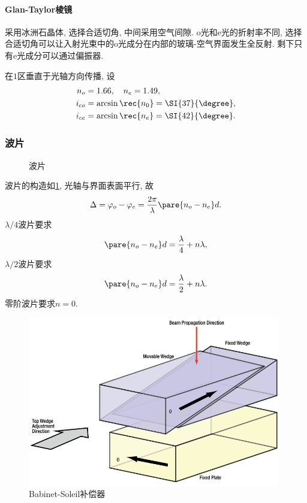 \documentclass{ctexart}
\begin{document}
\paragraph{Glan-Taylor棱镜} %
\label{par:glan_taylor棱镜}

采用冰洲石晶体, 选择合适切角, 中间采用空气间隙. o光和e光的折射率不同, 选择合适切角可以让入射光束中的o光成分在内部的玻璃-空气界面发生全反射. 剩下只有e光成分可以通过偏振器.
\par
在$1$区垂直于光轴方向传播, 设
\begin{align*}
    n_o &= 1.66,\quad n_e = 1.49, \\
    i_{co} &= \arcsin \rec{n_0} = \SI{37}{\degree}, \\
    i_{ce} &= \arcsin \rec{n_e} = \SI{42}{\degree}.
\end{align*}



\subsubsection{波片} %
\label{ssub:波片}

\begin{figure}[ht]
    \centering
    \caption{波片}
    \label{fig:波片}
\end{figure}
波片的构造如\cref{fig:波片}, 光轴与界面表面平行, 故
\[ \Delta = \varphi_o - \varphi_e = \frac{2\pi}{\lambda}\pare{n_o - n_e}d. \]
$\lambda/4$波片要求
\[ \pare{n_o - n_e}d = \frac{\lambda}{4} + n\lambda, \]
$\lambda/2$波片要求
\[ \pare{n_o - n_e}d = \frac{\lambda}{2} + n\lambda. \]
零阶波片要求$n=0$.

\begin{figure}[ht]
    \centering
    \includegraphics[width=11cm]{src/BabinetSoleil.png}
    \caption{Babinet-Soleil补偿器}
    \label{fig:babinet-soleil补偿器}
\end{figure}
\end{document}

